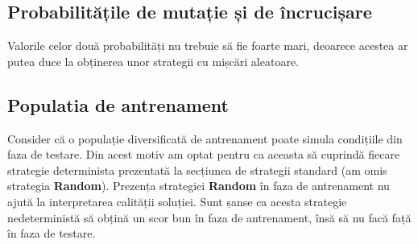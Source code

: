 \subsection{Probabilitățile de mutație și de încrucișare}

Valorile celor două probabilități nu trebuie să fie foarte mari, deoarece acestea ar putea duce la obținerea unor strategii cu mișcări aleatoare. 

\subsection{Populatia de antrenament}

Consider că o populație diversificată de antrenament poate simula condițiile din faza de testare. Din acest motiv am optat pentru ca aceasta să cuprindă fiecare strategie determinista prezentată la secțiunea de strategii standard (am omis strategia \textbf{Random}). Prezența strategiei \textbf{Random} în faza de antrenament nu ajută la interpretarea calității soluției. Sunt șanse ca acesta strategie nedeterministă să obțină un scor bun în faza de antrenament, însă să nu facă față în faza de testare. 

